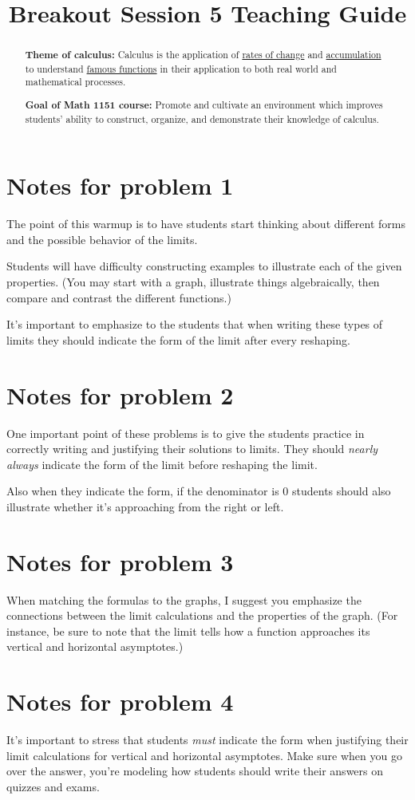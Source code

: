 \documentclass[nooutcomes]{ximera}
\title{Breakout Session 5 Teaching Guide}
\begin{document}
\begin{abstract}
 \textbf{Theme of calculus:} Calculus is the application of  \href{https://en.wikipedia.org/wiki/Derivative}{rates of change} and \href{https://en.wikipedia.org/wiki/Integral}{accumulation} to understand \href{https://en.wikipedia.org/wiki/Elementary_function}{famous functions} in their application to both real world and mathematical processes.

  \textbf{Goal of Math 1151 course:} Promote and cultivate an environment which improves students' ability to construct, organize, and demonstrate their knowledge of calculus.
\end{abstract}
\maketitle

\section{Notes for problem 1}
The point of this warmup is to have students start thinking about different forms and the possible behavior of the limits.

Students will have difficulty constructing examples to illustrate each of the given properties.
(You may start with a graph, illustrate things algebraically, then compare and contrast the different functions.)

It's important to emphasize to the students that when writing these types of limits they should indicate the form of the limit after every reshaping.

\section{Notes for problem 2}
One important point of these problems is to give the students practice in correctly writing and justifying their solutions to limits.
They should \emph{nearly always} indicate the form of the limit before reshaping the limit.

Also when they indicate the form, if the denominator is $0$ students should also illustrate whether it's approaching from the right or left.

\section{Notes for problem 3}
When matching the formulas to the graphs, I suggest you emphasize the connections between the limit calculations and the properties of the graph.
(For instance, be sure to note that the limit tells how a function approaches its vertical and horizontal asymptotes.)

\section{Notes for problem 4}
It's important to stress that students \emph{must} indicate the form when justifying their limit calculations for vertical and horizontal asymptotes.
Make sure when you go over the answer, you're modeling how students should write their answers on quizzes and exams.
\end{document}
